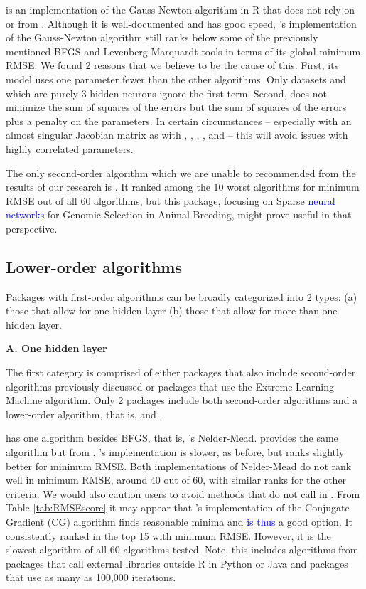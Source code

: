  \citep{R-brnn} is an implementation of the Gauss-Newton
algorithm in \textsf{R } that does not rely on  or 
from . Although it is well-documented and has good speed,
's implementation of the Gauss-Newton algorithm still ranks
below some of the previously mentioned BFGS and Levenberg-Marquardt
tools in terms of its global minimum RMSE. We found 2 reasons that we
believe to be the cause of this. First, its model uses one parameter
fewer than the other algorithms. Only datasets  and
 which are purely 3 hidden neurons ignore the first
term. Second,  does not minimize the sum of squares of the
errors but the sum of squares of the errors plus a penalty on the
parameters. In certain circumstances -- especially with an almost
singular Jacobian matrix as with , ,
, , and  -- this will avoid
issues with highly correlated parameters.

The only second-order algorithm which we are unable to recommended from
the results of our research is  \citep{R-snnR}. It ranked
among the 10 worst algorithms for minimum RMSE out of all 60 algorithms,
but this package, focusing on Sparse \textcolor{blue}{neural networks}
for Genomic Selection in Animal Breeding, might prove useful in that
perspective.

\hypertarget{lower-order-algorithms}{%
\subsection{Lower-order algorithms}\label{lower-order-algorithms}}

Packages with first-order algorithms can be broadly categorized into 2
types: (a) those that allow for one hidden layer (b) those that allow
for more than one hidden layer.

\textbf{A. One hidden layer}

The first category is comprised of either packages that also include
second-order algorithms previously discussed or packages that use the
Extreme Learning Machine algorithm. Only 2 packages include both
second-order algorithms and a lower-order algorithm, that is,
 and .

 has one algorithm besides BFGS, that is, 's
Nelder-Mead.  provides the same algorithm but from
. 's implementation is slower, as before, but
ranks slightly better for minimum RMSE. Both implementations of
Nelder-Mead do not rank well in minimum RMSE, around 40 out of 60, with
similar ranks for the other criteria. We would also caution users to
avoid methods that do not call  in . From
Table \ref{tab:RMSEscore} it may appear that 's
implementation of the Conjugate Gradient (CG) algorithm finds reasonable
minima and \textcolor{blue}{is thus} a good option. It consistently
ranked in the top 15 with minimum RMSE. However, it is the slowest
algorithm of all 60 algorithms tested. Note, this includes algorithms
from packages that call external libraries outside \textsf{R} in
\textsf{Python} or \textsf{Java} and packages that use as many as
100,000 iterations.

